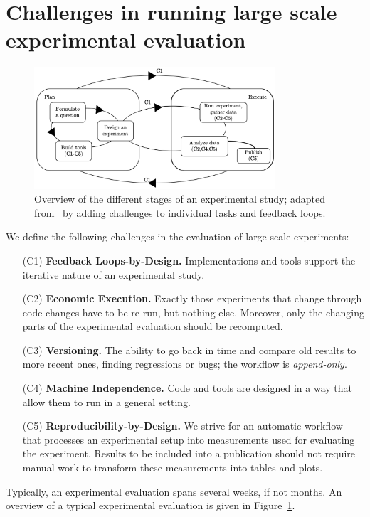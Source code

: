 \documentclass{llncs}
\begin{document}
\section{Challenges in running large scale experimental evaluation}
\begin{figure}[t]
  \centering
  \includegraphics[width=0.8\textwidth]{figs/experiment_scheme.png}
  \caption{Overview of the different stages of an experimental study; adapted from~\cite{DBLP:reference/algo/McGeoch08} by adding challenges to individual tasks and feedback loops.}
  \label{fig:overview}
\end{figure}
We define the following challenges in the  evaluation of large-scale experiments:
\begin{enumerate}
  \item[(C1)] \textbf{Feedback Loops-by-Design.} Implementations and tools support the iterative nature of an experimental study.
  \item[(C2)] \textbf{Economic Execution.} Exactly those experiments that change through code changes have to be re-run, but nothing else. 
  Moreover, only the changing parts of the experimental evaluation should be recomputed.
  \item[(C3)] \textbf{Versioning.} The ability to go back in time and compare old results to more recent ones, finding regressions or bugs; the workflow is \emph{append-only}.
  \item[(C4)] \textbf{Machine Independence.} Code and tools are designed in a way that allow them to run in a general setting.
  \item[(C5)] \textbf{Reproducibility-by-Design.} We strive for an automatic workflow that processes an experimental setup into measurements used for evaluating the experiment. Results to be included into a publication should not require manual work to transform these measurements into tables and plots.
\end{enumerate}
%
%
Typically, an experimental evaluation spans several weeks, if not months. An overview of a typical experimental evaluation is given in Figure~\ref{fig:overview}. 
\end{document}
